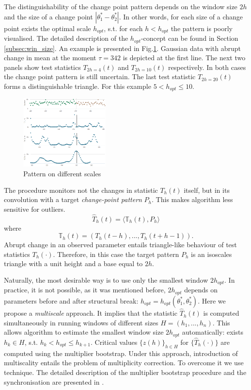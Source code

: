 The distinguishability of the change point pattern depends on the window size $2h$ and the size of a change point $|\theta_1^* - \theta_2^*|$. In other words, for each size of a change point exists the optimal scale $h_{opt}$, s.t. for each $h < h_{opt}$ the pattern is poorly visualised.   
The detailed description of the $h_{opt}$-concept can be found in Section \ref{subsec:win_size}. An example is presented in Fig.\ref{fig:scales}. Gaussian data with abrupt change in mean at the moment $\tau = 342$ is depicted at the first line. The next two panels show test statistics $ T_{2h = 4}(t)$ and $T_{2h = 10}(t)$ respectively. In both cases the change point pattern is still uncertain. The last test statistic $T_{2h = 20}(t)$ forms a distinguishable triangle. For this example $5 < h_{opt} \leq 10$. 
\begin{figure}[!h]
    \centering
    \includegraphics[width=0.4\textwidth, height=0.4\textwidth]{images/multiscale.png}
    \caption{Pattern on different scales}
    \label{fig:scales}
\end{figure}
The procedure monitors not the changes in statistic $T_{h}(t)$ itself, but in its convolution with a target \textit{change-point pattern} $P_{h}$. This makes algorithm less sensitive for outliers.
\[
\hat{T}_{h}(t) = \langle\mathbb{T}_{h}(t), P_{h}\rangle
\]
where
\[
\mathbb{T}_{h}(t) = (T_{h}(t - h),..., T_{h}(t + h - 1)). 
\]
Abrupt change in an observed parameter entails triangle-like behaviour of test statistics $T_{h}(\cdot)$. Therefore, in this case the target pattern $P_h$ is an isoscales triangle with a unit height and a base equal to $2h$.

Naturally, the most desirable way is to use only the smallest window $2h_{opt}$. In practice, it is not possible, as it was mentioned before, $2h_{opt}$ depends on parameters before and after structural break: $h_{opt} = h_{opt}(\theta_1^*, \theta_2^*)$. Here we propose a \textit{multiscale} approach. It implies that the statistic $\hat{T}_{h}(t)$ is computed simultaneously in running windows of different sizes $H = (h_1,..., h_n)$. This allows algorithm to estimate the smallest window size $2h_{opt}$ automatically: exists $h_k \in H$, s.t. $h_k < h_{opt} \leq h_{k+1} $. Critical values $\{z(h)\}_{h \in H}$ for $\{\hat{T}_{h}(\cdot)\}$ are computed using the multiplier bootstrap. Under this approach, introduction of multiscality entails the problem of multiplicity correction. To overcome it we use  technique. The detailed description of the multiplier bootstrap procedure and the synchronisation are presented in \citet{SpokoinyBoot}. 


